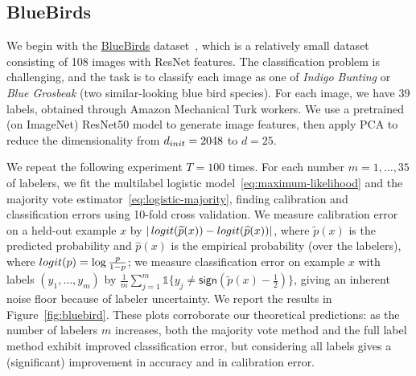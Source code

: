 \documentclass[11pt]{article}
\newcommand{\ha}[1]{\textcolor{ha}{[HA: #1]}}
\newcommand{\ind}{\mathds{1}}
\newcommand{\what}[1]{\widehat{#1}}
\newcommand{\wt}[1]{\widetilde{#1}}
\newcommand{\sgn}{\mathsf{sign}}
\newcommand{\<}{\langle} %
\renewcommand{\>}{\rangle}
\newcommand{\half}{\frac{1}{2}}
\begin{document}



\subsection{BlueBirds}
\label{sec:BB}

We begin with the
\href{https://github.com/eaplatanios/noisy-labels}{BlueBirds}
dataset~\cite{WelinderBrPeBe10}, which is a relatively small dataset
consisting of 108 images with ResNet features.  The classification problem
is challenging, and the task is to classify each image as one of
\textit{Indigo Bunting} or \textit{Blue Grosbeak} (two similar-looking blue
bird species). For each image, we have $39$ labels, obtained through Amazon
Mechanical Turk workers.  We use a pretrained (on ImageNet)
ResNet50 model to generate image
features, then apply PCA to reduce the dimensionality from
$d_{\textup{init}} = 2048$ to $d=25$.

We repeat the following experiment $T = 100$ times.
For each number $m = 1, \ldots, 35$ of labelers, we fit
the multilabel logistic model~\eqref{eq:maximum-likelihood}
and the majority vote estimator~\eqref{eq:logistic-majority},
finding calibration and classification errors using 10-fold cross validation.
We measure calibration error on a held-out example $x$
by $|\logit(\wt{p}(x)) -
\logit(\what{p}(x))|$, where $\wt{p}(x)$ is the predicted probability
and $\what{p}(x)$ is the empirical probability (over the labelers),
where $\logit(p) = \log\frac{p}{1 - p}$; we measure classification
error on example $x$ with
labels $(y_1, \ldots, y_m)$ by $\frac{1}{m} \sum_{j = 1}^m \ind\{y_j \neq
\sgn(\wt{p}(x) - \half)\}$, giving an inherent noise floor because
of labeler uncertainty. We
report the results in Figure~\ref{fig:bluebird}.
These plots corroborate
our theoretical predictions: as the number of labelers $m$ increases, both
the majority vote method and the full label method exhibit improved
classification error, but considering all labels gives a (significant)
improvement in accuracy and in calibration error.
\end{document}

